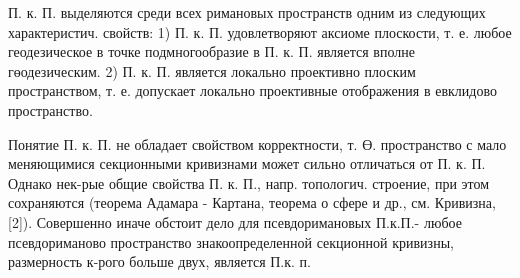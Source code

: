 \documentclass[10pt]{article}
\begin{document}
П. к. П. выделяются среди всех римановых пространств одним из следующих характеристич. свойств: 1) П. к. П. удовлетворяют аксиоме плоскости, т. е. любое геодезическое в точке подмногообразие в П. к. П. является вполне гөодезическим. 2) П. к. П. является локально проективно плоским пространством, т. е. допускает локально проективные отображения в евклидово пространство.



Понятие П. к. П. не обладает свойством корректности, т. Ө. пространство с мало меняющимися секционными кривизнами может сильно отличаться от П. к. П. Однако нек-рые общие свойства П. к. П., напр. топологич. строение, при этом сохраняются (теорема Адамара - Картана, теорема о сфере и др., см. Кривизна, [2]). Совершенно иначе обстоит дело для псевдоримановых П.к.П.- любое псевдориманово пространство знакоопределенной секционной кривизны, размерность к-рого больше двух, является П.к. п.
\end{document}
